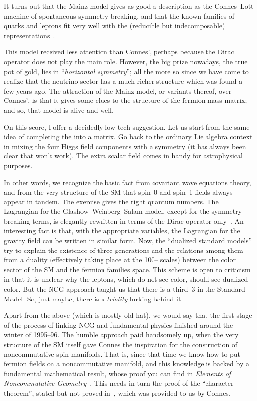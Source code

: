 \documentclass[a4paper,12pt]{article}
\providecommand{\sul}{\mathfrak{su}}    %
\DeclareMathOperator{\TeV}{TeV}     %
\providecommand{\ul}{\mathfrak{u}}      %
\providecommand{\x}{\times}             %
\providecommand{\1}{\mathbf{1}}         %
\providecommand{\7}{\dagger}            %
\providecommand{\8}{\bullet}            %
\renewcommand{\.}{\cdot}            %
\renewcommand{\:}{\colon}           %
\begin{document}
It turns out that the Mainz model gives as good a description as the
Connes--Lott machine of spontaneous symmetry breaking, and that the
known families of quarks and leptons fit very well with the (reducible
but indecomposable) \myHighlight{$\sul(2|1)$}\coordHE{} representations~\cite{Scheck}.

This model received less attention than Connes', perhaps because the
Dirac operator does not play the main role. However, the big prize
nowadays, the true pot of gold, lies in ``\textit{horizontal
symmetry}''; all the more so since we have come to realize that the
neutrino sector has a much richer structure which was found a few
years ago. The attraction of the Mainz model, or variants thereof,
over Connes', is that it gives some clues to the structure of the
fermion mass matrix; and so, that model is alive and well.

On this score, I offer a decidedly low-tech suggestion. Let us start
from the same idea of completing the \myHighlight{$\sul(2) \x \ul(1)$}\coordHE{} into a
\myHighlight{$3 \x 3$}\coordHE{} matrix. Go back to the ordinary Lie algebra context in mixing
the four Higgs field components with a \myHighlight{$\ul(3)$}\coordHE{} symmetry (it has
always been clear that \myHighlight{$\sul(3)$}\coordHE{} won't work). The extra scalar field
comes in handy for astrophysical purposes.

In other words, we recognize the basic fact from covariant wave
equations theory, and from the very structure of the SM that spin~0
and spin~1 fields always appear in tandem. The exercise gives the
right quantum numbers. The Lagrangian for the Glashow--Weinberg--Salam
model, except for the symmetry-breaking terms, is elegantly rewritten
in terms of the Dirac operator only~\cite{ChavesM}. An interesting
fact is that, with the appropriate variables, the Lagrangian for the
gravity field can be written in similar form. Now, the ``dualized
standard models'' try to explain the existence of three generations
and the relations among them from a duality (effectively taking place
at the 100--\myHighlight{$1000 \TeV$}\coordHE{} scales) between the \myHighlight{$\sul(3)$}\coordHE{} color sector of
the SM and the fermion families space. This scheme is open to
criticism in that it is unclear why the leptons, which do not see
color, should see dualized color. But the NCG approach taught us that
there is a third~3 in the Standard Model. So, just maybe, there is a
\textit{triality} lurking behind it.

Apart from the above (which is mostly old hat), we would say that the
first stage of the process of linking NCG and fundamental physics
finished around the winter of 1995--96. The humble approach paid
handsomely up, when the very structure of the SM itself gave
Connes the inspiration for the construction of noncommutative spin
manifolds. That is, since that time we know how to put fermion fields
on a noncommutative manifold, and this knowledge is backed by a
fundamental mathematical result, whose proof you can find in
{\it Elements of Noncommutative Geometry\/}~\cite{Polaris}. This needs
in turn the proof of the ``character theorem'', stated but not proved
in~\cite{Book}, which was provided to us by Connes.
\end{document}
